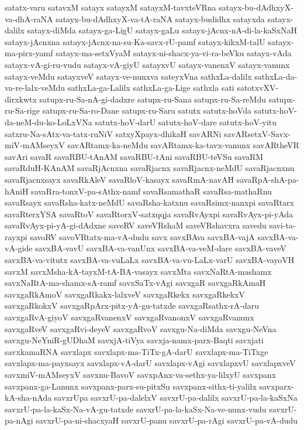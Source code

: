 {satatx-varu
satavxM
satayx
satayxM
satayxM-tavxteVRna
satayx-bu-dAdhxyX-va-dhA-raNA
satayx-bu-dAdhxyX-va-tA-raNA
satayx-budidhx
satayxda
satayx-dalilx
satayx-diMda
satayx-ga-LigU
satayx-gaLu
satayx-jAcnx-nA-di-la-kaSxNaH
satayx-jAcnxna
satayx-jAcnx-na-su-Ka-savx-rU-pamf
satayx-kikxM-talU
satayx-ma-pirx-yamf
satayx-ma-setxVyaM
satayx-ni-shacx-ya-vi-ra-beVku
satayx-vAda
satayx-vA-gi-ru-vudu
satayx-vA-giyU
satayxvU
satayx-vanenxV
satayx-vanunx
satayx-veMdu
satayxveV
satayx-ve-nunxva
sateyxVna
sathxLa-dalilx
sathxLa-da-va-re-lalx-veMdu
sathxLa-ga-Lalilx
sathxLa-ga-Lige
sathxla
sati
satotxvXV-dirxkwtx
satupx-ru-Sa-nA-gi-dadxre
satupx-ru-Sana
satupx-ru-Sa-reMdu
satupx-ru-Sa-rige
satupx-ru-Sa-ro-Dane
satupx-ru-Saru
satutx
satutx-hoVda
satutx-hoV-da-neM-du-ko-LoLxVNa
satutx-hoV-darU
satutx-hoV-dare
satutx-hoV-yitu
satxru-Na-sAtx-va-tatx-ruNiV
satxyXpayx-dhikaH
savARNi
savARsetxV-Savx-miV-mAMseyxV
savARtamx-ka-neMdu
savARtamx-ka-tavx-vanunx
savARtheVR
savAri
savaR
savaRBU-tAnAM
savaRBU-tAni
savaRBU-teVSu
savaRM
savaRduH-KAnAM
savaRjAcnxna
savaRjacnx
savaRjacnx-neMdU
savaRjacnxnu
savaRjacnxsayx
savaRkAleV
savaRloV-kasayx
savaRmA-navAH
savaRpA-shA-pa-hAniH
savaRra-tonxV-pa-sAthx-namf
savaRsamathaR
savaRsa-mathaRnu
savaRsayx
savaRsha-katx-neMdU
savaRsha-katxnu
savaRsimx-nanxpi
savaRtarx
savaRterxYSA
savaRtoV
savaRtorxV-satxqqja
savaRvAyxpi
savaRvAyx-pi-yAda
savaRvAyx-pi-yA-gi-dAdxne
saveRV
saveVRshaM
saveVRshavxra
savedu
savi-ta-rayxpi
savoRV
savoVRtatx-ma-vA-dudu
savx
savxBAva
savxBA-vajA
savxBA-va-vA-gide
savxBA-vavU
savxBA-va-vanUnx
savxBA-va-veM-dare
savxBA-vaveV
savxBA-va-vitutx
savxBA-va-vuLaLx
savxBA-va-vu-LaLx-varU
savxBA-vayoVH
savxM
savxMsha-kA-tayxM-tA-BA-vasayx
savxMta
savxNaRtA-mashamx
savxNaRtA-ma-shamx-sA-ramf
savxSaTx-vAgi
savxgaR
savxgaRkAmaH
savxgaRkAmoV
savxgaRkakx-lalxveV
savxgaRkekx
savxgaRkekxV
savxgaRkokxV
savxgaRpArx-pitx-yA-gu-tatxde
savxgaRsathx-rA-daru
savxgaRvA-giyoV
savxgaRvanenxV
savxgaRvanonxV
savxgaRvanunx
savxgaRveV
savxgaRvi-deyeV
savxgaRvoV
savxgu-Na-diMda
savxgu-NeVna
savxgu-NeYniR-gUDhaM
savxjA-tiVya
savxja-namx-parx-Baqti
savxjati
savxkamaRNA
savxlapx
savxlapx-ma-TiTx-gA-darU
savxlapx-ma-TiTxge
savxlapx-ma-payxsayx
savxlapx-vA-darU
savxlapx-vAgi
savxlapxvU
savxlapxveV
savxmiV-mAMseyxV
savxnu-BavoV
savxpAnx-va-sethx-ya-lilxyU
savxpanx
savxpanx-ga-Lanunx
savxpanx-parx-su-pitxSu
savxpanx-sithx-ti-yalilx
savxparx-kA-sha-nAda
savxrUpa
savxrU-pa-dalelxV
savxrU-pa-dalilx
savxrU-pa-la-kaSxNa
savxrU-pa-la-kaSx-Na-vA-gu-tatxde
savxrU-pa-la-kaSx-Na-ve-nunx-vudu
savxrU-pa-nAgi
savxrU-pa-ni-shacxyaH
savxrU-panu
savxrU-pa-rAgi
savxrU-pa-vA-dudu
}
